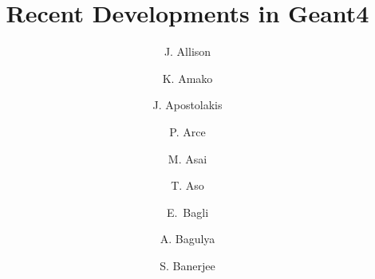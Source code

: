 \documentclass[final,5p,times,longtitle,twocolumn]{elsarticle}
\begin{document}
\begin{frontmatter}



\title{Recent Developments in Geant4}


\author[a,b]{J. Allison}
\address[a]{Geant4 Associates International Ltd., 9 Royd Terrace, Hebden Bridge HX7 7BT, United Kingdom}
\address[b]{The University of Manchester, School of Physics and Astronomy, Manchester M13 9PL, United Kingdom}

\author[c,a]{K. Amako}
\address[c]{KEK, 1-1 Oho, Tsukuba, Ibaraki 305-0801, Japan}

\author[d]{J. Apostolakis}
\address[d]{CERN, 1211 Gen\'{e}ve 23, Switzerland}

\author[e]{P. Arce}
\address[e]{CIEMAT, Medical Applications Unit, Avenida Complutense 40, 28040 Madrid, Spain}

\author[f]{M. Asai}
\address[f]{SLAC National Accelerator Laboratory, 2575 Sand Hill Road, Menlo Park, CA 94025, USA}

\author[g]{T. Aso}
\address[g]{National Institute of Technology, Toyama College, 1-2 Ebie Neriya, Imizu, Toyama 9330293, Japan}

\author[h]{E.~Bagli}
\address[h]{INFN Sezione di Ferrara, Via Saragat 1, 44122 Ferrara, Italy}

\author[i]{A. Bagulya}
\address[i]{Lebedev Physical Institute, Leninskii Pr. 53, Moscow 119991, Russia}

\author[j]{S. Banerjee}
\address[j]{Fermi National Accelerator Laboratory, P.O. Box 500, Batavia, IL 60510, USA}


\end{frontmatter}
\end{document}
